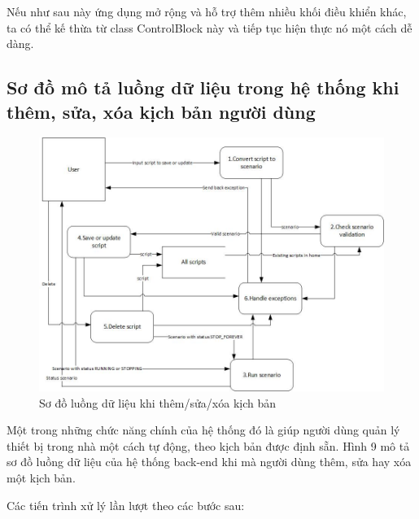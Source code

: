 \documentclass[12pt,a4paper,oneside]{extbook}
\begin{document}
Nếu như sau này ứng dụng mở rộng và hỗ trợ thêm nhiều khối điều khiển khác, ta có thể kế thừa từ class ControlBlock này và tiếp tục hiện thực nó một cách dễ dàng.

\subsection{Sơ đồ mô tả luồng dữ liệu trong hệ thống khi thêm, sửa, xóa kịch bản người dùng}

\begin{figure}[h]
  \centering
    \includegraphics[width=15cm]{6-DFD-CRUD-action-with-script}
  \caption{Sơ đồ luồng dữ liệu khi thêm/sửa/xóa kịch bản}\label{fig:6-DFD-CRUD-action-with-script}
\end{figure}

Một trong những chức năng chính của hệ thống đó là giúp người dùng quản lý thiết bị trong nhà một cách tự động, theo kịch bản được định sẵn. Hình 9 mô tả sơ đồ luồng dữ liệu của hệ thống back-end khi mà người dùng thêm, sửa hay xóa một kịch bản.

Các tiến trình xử lý lần lượt theo các bước sau:
\end{document}
